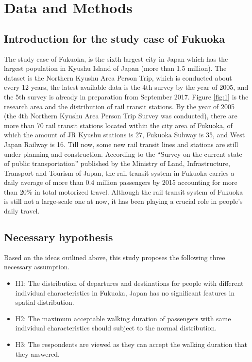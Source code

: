 \documentclass[Journal,letterpaper]{ascelike-new}
\begin{document}
%
\section{Data and Methods}

%
\subsection{Introduction for the study case of Fukuoka}
The study case of Fukuoka, is the sixth largest city in Japan which has the largest population in Kyushu Island of Japan (more than 1.5 million). The dataset is the Northern Kyushu Area Person Trip, which is conducted about every 12 years, the latest available data is the 4th survey by the year of 2005, and the 5th survey is already in preparation from September 2017. Figure \ref{fig:1} is the research area and the distribution of rail transit stations. By the year of 2005 (the 4th Northern Kyushu Area Person Trip Survey was conducted), there are more than 70 rail transit stations located within the city area of Fukuoka, of which the amount of JR Kyushu stations is 27, Fukuoka Subway is 35, and West Japan Railway is 16. Till now, some new rail transit lines and stations are still under planning and construction. According to the “Survey on the current state of public transportation” published by the Ministry of Land, Infrastructure, Transport and Tourism of Japan, the rail transit system in Fukuoka carries a daily average of more than 0.4 million passengers by 2015 accounting for more than 20\% in total motorized travel. Although the rail transit system of Fukuoka is still not a large-scale one at now, it has been playing a crucial role in people's daily travel.

%
\subsection{Necessary hypothesis}
Based on the ideas outlined above, this study proposes the following three necessary assumption.

\begin{itemize}
\item H1: The distribution of departures and destinations for people with different individual characteristics in Fukuoka, Japan has no significant features in spatial distribution. 

\item H2: The maximum acceptable walking duration of passengers with same individual characteristics should subject to the normal distribution. 

\item H3: The respondents are viewed as they can accept the walking duration that they answered.
\end{itemize}
\end{document}
